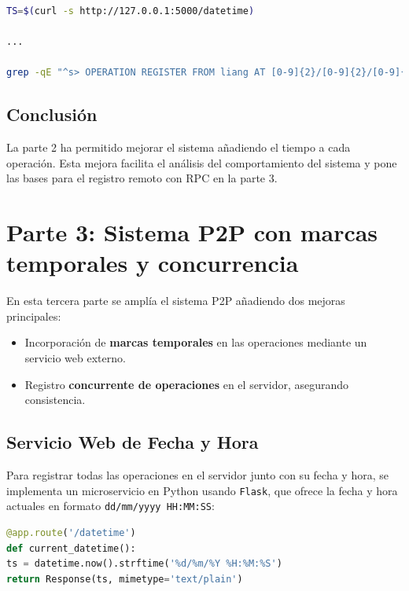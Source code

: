 \documentclass[12pt,a4paper]{article}
\begin{document}
\begin{lstlisting}[language=bash,caption={Script de prueba automatizada},label=lst:web4]
TS=$(curl -s http://127.0.0.1:5000/datetime)

...

grep -qE "^s> OPERATION REGISTER FROM liang AT [0-9]{2}/[0-9]{2}/[0-9]{4}" server.log
\end{lstlisting}

\subsection{Conclusión}

La parte 2 ha permitido mejorar el sistema añadiendo el tiempo a cada operación. Esta mejora facilita el análisis del comportamiento del sistema y pone las bases para el registro remoto con RPC en la parte 3.

\section{Parte 3: Sistema P2P con marcas temporales y concurrencia}

En esta tercera parte se amplía el sistema P2P añadiendo dos mejoras principales:

\begin{itemize}
\item Incorporación de \textbf{marcas temporales} en las operaciones mediante un servicio web externo.
\item Registro \textbf{concurrente de operaciones} en el servidor, asegurando consistencia.
\end{itemize}

\subsection{Servicio Web de Fecha y Hora}

Para registrar todas las operaciones en el servidor junto con su fecha y hora, se implementa un microservicio en Python usando \texttt{Flask}, que ofrece la fecha y hora actuales en formato \texttt{dd/mm/yyyy HH:MM:SS}:

\begin{lstlisting}[language=Python,caption={datetime_service.py},label=lst:datetime]
@app.route('/datetime')
def current_datetime():
ts = datetime.now().strftime('%d/%m/%Y %H:%M:%S')
return Response(ts, mimetype='text/plain')
\end{lstlisting}
\end{document}

